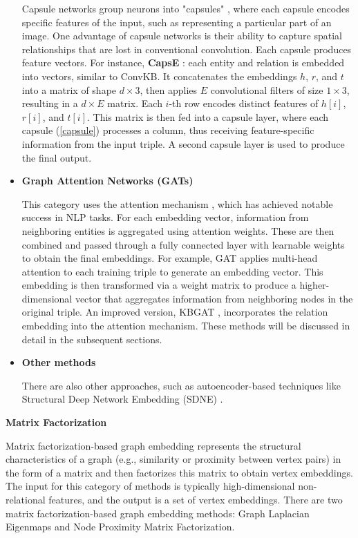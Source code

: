 \begin{itemize}
	Capsule networks group neurons into "capsules" \label{capsule}, where each capsule encodes specific features of the input, such as representing a particular part of an image. One advantage of capsule networks is their ability to capture spatial relationships that are lost in conventional convolution. Each capsule produces feature vectors. For instance, \textbf{CapsE} \cite{vu2019capsule}: each entity and relation is embedded into vectors, similar to ConvKB. It concatenates the embeddings $h$, $r$, and $t$ into a matrix of shape $d \times 3$, then applies $E$ convolutional filters of size $1 \times 3$, resulting in a $d \times E$ matrix. Each $i$-th row encodes distinct features of $h[i]$, $r[i]$, and $t[i]$. This matrix is then fed into a capsule layer, where each capsule (\ref{capsule}) processes a column, thus receiving feature-specific information from the input triple. A second capsule layer is used to produce the final output.
	
	\item \textbf{Graph Attention Networks (GATs)}
	
	This category uses the attention mechanism \cite{vaswani2017attention}, which has achieved notable success in NLP tasks. For each embedding vector, information from neighboring entities is aggregated using attention weights. These are then combined and passed through a fully connected layer with learnable weights to obtain the final embeddings. For example, GAT \cite{velivckovic2017graph} applies multi-head attention to each training triple to generate an embedding vector. This embedding is then transformed via a weight matrix to produce a higher-dimensional vector that aggregates information from neighboring nodes in the original triple. An improved version, KBGAT \cite{nathani2019learning}, incorporates the relation embedding into the attention mechanism. These methods will be discussed in detail in the subsequent sections.
	
	\item \textbf{Other methods}
	
	There are also other approaches, such as autoencoder-based techniques like Structural Deep Network Embedding (SDNE) \cite{wang2016structural}.
\end{itemize}




\textbf{Matrix Factorization}

Matrix factorization-based graph embedding represents the structural characteristics of a graph (e.g., similarity or proximity between vertex pairs) in the form of a matrix and then factorizes this matrix to obtain vertex embeddings. The input for this category of methods is typically high-dimensional non-relational features, and the output is a set of vertex embeddings. There are two matrix factorization-based graph embedding methods: Graph Laplacian Eigenmaps and Node Proximity Matrix Factorization.

